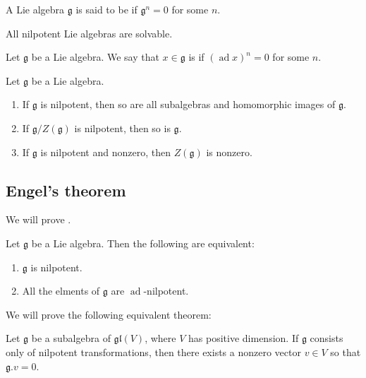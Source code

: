 \documentclass{article}
\newcommand*\ad{\operatorname{ad}}
\newcommand*\frkg{{\ensuremath{\mathfrak{g}}}}
\newcommand*\gl{\ensuremath{\mathfrak{gl}}}
\newcommand*\acts{.}
\begin{document}
\begin{definition}
    A Lie algebra $\frkg$ is said to be  if $\frkg^n = 0$ for some $n$.
\end{definition}

\begin{proposition}
    All nilpotent Lie algebras are solvable.
\end{proposition}

\begin{definition}
    Let $\frkg$ be a Lie algebra.
    We say that $x \in \frkg$ is  if $(\ad x)^n = 0$ for some $n$.
\end{definition}

\begin{theorem}
    Let $\frkg$ be a Lie algebra.
    \begin{enumerate}[label=(\alph*)]
        \item 
            If $\frkg$ is nilpotent, then so are all subalgebras and homomorphic images of $\frkg$.
        \item 
            If $\frkg/Z(\frkg)$ is nilpotent, then so is $\frkg$.
        \item 
            If $\frkg$ is nilpotent and nonzero, then $Z(\frkg)$ is nonzero.
    \end{enumerate}
\end{theorem}

\subsection{Engel's theorem \cite[\S 3.3]{Hum72}}

We will prove .

\begin{theorem}[Engel]
    Let $\frkg$ be a Lie algebra.
    Then the following are equivalent:
    \begin{enumerate}[label=(\roman*)]
        \item 
            $\frkg$ is nilpotent.
        \item 
            All the elments of $\frkg$ are $\ad$-nilpotent.
    \end{enumerate}
\end{theorem}

We will prove the following equivalent theorem:

\begin{theorem}
    \label{thm:EngelsCommonEigenvector}
    Let $\frkg$ be a subalgebra of $\gl(V)$, where $V$ has positive dimension.
    If $\frkg$ consists only of nilpotent transformations, then there exists a nonzero vector $v \in V$ so that $\frkg \acts v = 0$.
\end{theorem}
\end{document}
